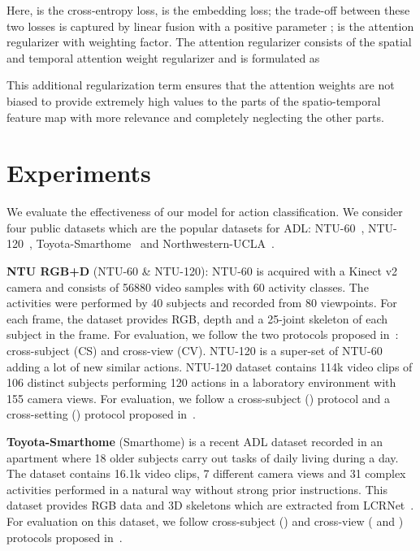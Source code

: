 \documentclass[runningheads]{llncs}
\begin{document}
Here,  is the cross-entropy loss,  is the embedding loss; the trade-off between these two losses is captured by linear fusion with a positive parameter ;
 is the attention regularizer with  weighting factor. The attention regularizer consists of the spatial and temporal attention weight regularizer and is formulated as 

This additional regularization term  ensures that the attention weights are not biased to provide extremely high values to the parts of the spatio-temporal feature map with more relevance and completely neglecting the other parts. \\




\section{Experiments}
We evaluate the effectiveness of our model for action classification. We consider four public datasets which are the popular datasets for ADL: NTU-60~\cite{NTU_RGB+D}, NTU-120~\cite{ntu120}, Toyota-Smarthome~\cite{STA_iccv} and Northwestern-UCLA~\cite{nucla}.

\noindent\textbf{NTU RGB+D} (NTU-60 \& NTU-120): NTU-60 is acquired with a Kinect v2 camera and consists of 56880 video samples with 60 activity classes. The activities were performed by 40 subjects and recorded from 80 viewpoints. For each frame, the dataset provides RGB, depth and a 25-joint skeleton of each subject in the frame. For evaluation, we follow the two protocols proposed in~\cite{NTU_RGB+D}: cross-subject (CS) and cross-view (CV). NTU-120 is a super-set of NTU-60 adding a lot of new similar actions. NTU-120 dataset contains 114k video clips of 106 distinct subjects performing 120 actions in a laboratory environment with 155 camera views. For evaluation, we follow a cross-subject () protocol and a cross-setting () protocol proposed in~\cite{ntu120}.

\noindent\textbf{Toyota-Smarthome} (Smarthome) is a recent ADL dataset recorded in an apartment where 18 older subjects carry out tasks of daily living during a day. The dataset contains 16.1k video clips, 7 different camera views and 31 complex activities performed in a natural way without strong prior instructions. This dataset provides RGB data and 3D skeletons which are extracted from LCRNet~\cite{lcrnet_new}. For evaluation
 on this dataset, we follow cross-subject () and cross-view ( and ) protocols proposed in~\cite{STA_iccv}.
\end{document}
